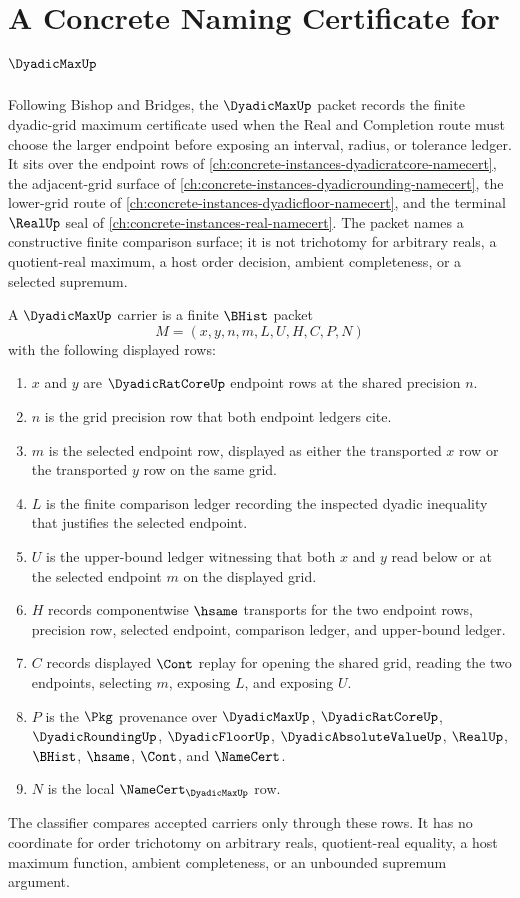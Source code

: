 \chapter{A Concrete Naming Certificate for $\DyadicMaxUp$}
\label{ch:concrete-instances-dyadicmax-namecert}

Following Bishop and Bridges, the $\DyadicMaxUp$ packet records the finite dyadic-grid maximum certificate used when the Real and Completion route must choose the larger endpoint before exposing an interval, radius, or tolerance ledger. It sits over the endpoint rows of \autoref{ch:concrete-instances-dyadicratcore-namecert}, the adjacent-grid surface of \autoref{ch:concrete-instances-dyadicrounding-namecert}, the lower-grid route of \autoref{ch:concrete-instances-dyadicfloor-namecert}, and the terminal $\RealUp$ seal of \autoref{ch:concrete-instances-real-namecert}. The packet names a constructive finite comparison surface; it is not trichotomy for arbitrary reals, a quotient-real maximum, a host order decision, ambient completeness, or a selected supremum.

\begin{definition}
\label{def:dyadic-max-carrier}
A $\DyadicMaxUp$ carrier is a finite $\BHist$ packet
$$
M=(x,y,n,m,L,U,H,C,P,N)
$$
with the following displayed rows:
\begin{enumerate}
\item $x$ and $y$ are $\DyadicRatCoreUp$ endpoint rows at the shared precision $n$.
\item $n$ is the grid precision row that both endpoint ledgers cite.
\item $m$ is the selected endpoint row, displayed as either the transported $x$ row or the transported $y$ row on the same grid.
\item $L$ is the finite comparison ledger recording the inspected dyadic inequality that justifies the selected endpoint.
\item $U$ is the upper-bound ledger witnessing that both $x$ and $y$ read below or at the selected endpoint $m$ on the displayed grid.
\item $H$ records componentwise $\hsame$ transports for the two endpoint rows, precision row, selected endpoint, comparison ledger, and upper-bound ledger.
\item $C$ records displayed $\Cont$ replay for opening the shared grid, reading the two endpoints, selecting $m$, exposing $L$, and exposing $U$.
\item $P$ is the $\Pkg$ provenance over $\DyadicMaxUp$, $\DyadicRatCoreUp$, $\DyadicRoundingUp$, $\DyadicFloorUp$, $\DyadicAbsoluteValueUp$, $\RealUp$, $\BHist$, $\hsame$, $\Cont$, and $\NameCert$.
\item $N$ is the local $\NameCert_{\DyadicMaxUp}$ row.
\end{enumerate}
The classifier compares accepted carriers only through these rows. It has no coordinate for order trichotomy on arbitrary reals, quotient-real equality, a host maximum function, ambient completeness, or an unbounded supremum argument.
\end{definition}

